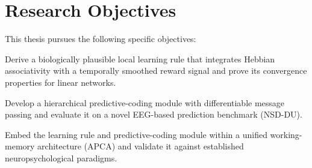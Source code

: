\section{Research Objectives}

This thesis pursues the following specific objectives:
\begin{description}[leftmargin=2.5em, style=nextline]
  \item[Objective 1] Derive a biologically plausible local learning rule that integrates
        Hebbian associativity with a temporally smoothed reward signal and prove its
        convergence properties for linear networks.
  \item[Objective 2] Develop a hierarchical predictive-coding module with differentiable
        message passing and evaluate it on a novel EEG-based prediction benchmark
        (NSD-DU).
  \item[Objective 3] Embed the learning rule and predictive-coding module within a unified
        working-memory architecture (APCA) and validate it against established
        neuropsychological paradigms.
\end{description}
